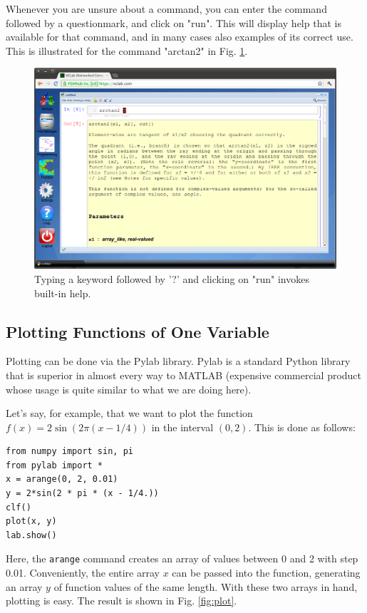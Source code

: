 \documentclass[article,A4,12pt]{llncs}
\begin{document}
Whenever you are unsure about a command, you can enter the 
command followed by a questionmark, and click on "run". This will 
display help that is available for that command, and in many cases also
examples of its correct use. This is illustrated for the command 
"arctan2" in Fig. \ref{fig:help}.

\begin{figure}[!ht]
\begin{center}
\includegraphics[width=\textwidth]{img/help.png}
\end{center}
\vspace{-2mm}
\caption{Typing a keyword followed by '?' and clicking on "run" invokes built-in help.}
\label{fig:help}
\end{figure}





\subsection{Plotting Functions of One Variable}

Plotting can be done via the Pylab library. Pylab is a standard Python library that is 
superior in almost every way to MATLAB (expensive commercial product whose usage is 
quite similar to what we are doing here). 

\newpage
\noindent
Let's say, for example, that we want to plot the function $f(x) = 2\sin(2\pi(x - 1/4))$
in the interval $(0, 2)$. This is done as follows:

{\small
\begin{verbatim}
from numpy import sin, pi
from pylab import *
x = arange(0, 2, 0.01)
y = 2*sin(2 * pi * (x - 1/4.))
clf()
plot(x, y)
lab.show()
\end{verbatim}
}
\noindent
Here, the {\tt arange} command creates an array of values between 0 and 2 with step 0.01.
Conveniently, the entire array $x$ can be passed into the function, generating an
array $y$ of function values of the same length. With these two arrays in hand, plotting is easy. 
The result is shown in Fig. \ref{fig:plot}.
\end{document}
